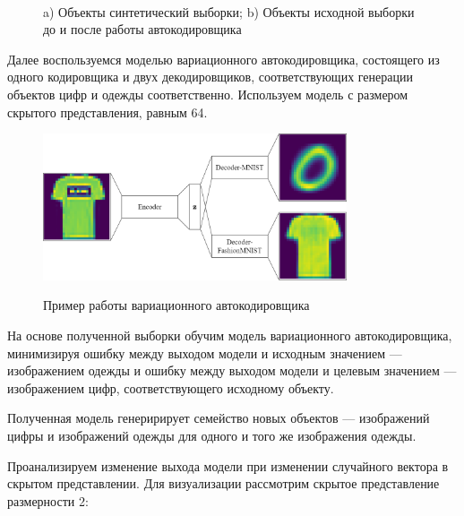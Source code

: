 \begin{figure}[h!t]\center
{}
\qquad
{}\\
\caption{a) Объекты синтетический выборки; b) Объекты исходной выборки до и после работы автокодировщика}
\end{figure}
Далее воспользуемся моделью вариационного автокодировщика, состоящего из одного кодировщика и двух декодировщиков, соответствующих генерации объектов цифр и одежды соответственно. Используем модель с размером скрытого представления, равным 64.

\begin{figure}[h!t]\center
{\includegraphics[width=0.8\textwidth]{results/VAE.png}}
\caption{Пример работы вариационного автокодировщика}
\end{figure}

На основе полученной выборки обучим модель вариационного автокодировщика, минимизируя ошибку между выходом модели и исходным значением --- изображением одежды и ошибку между выходом модели и целевым значением --- изображением цифр, соответствующего исходному объекту.

Полученная модель генеририрует семейство новых объектов --- изображений цифры и изображений одежды для одного и того же изображения одежды.

\newpage

Проанализируем изменение выхода модели при изменении случайного вектора в скрытом представлении. Для визуализации рассмотрим скрытое представление размерности 2:

